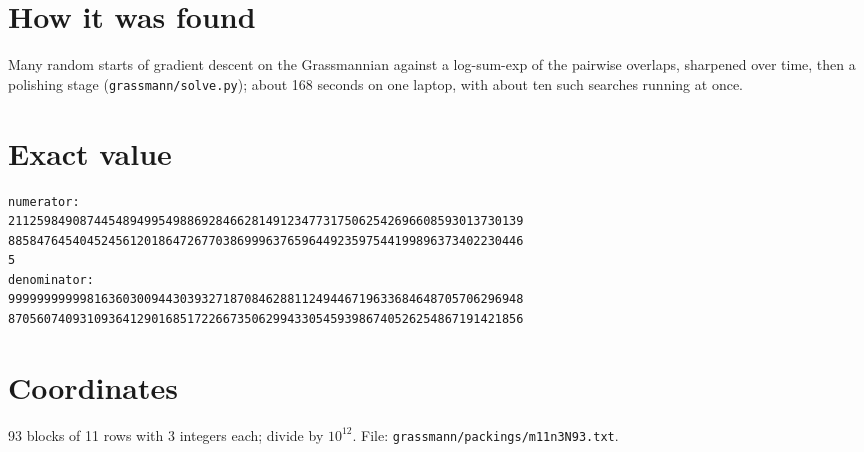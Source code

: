 \documentclass[11pt,a4paper]{article}
\begin{document}
\section{How it was found}
Many random starts of gradient descent on the Grassmannian against a log-sum-exp of the pairwise overlaps, sharpened over time, then a polishing stage (\texttt{grassmann/solve.py}); about 168 seconds on one laptop, with about ten such searches running at once.


\appendix
\section{Exact value}
{\small
\begin{verbatim}
numerator:
211259849087445489499549886928466281491234773175062542696608593013730139
885847645404524561201864726770386999637659644923597544199896373402230446
5
denominator:
999999999998163603009443039327187084628811249446719633684648705706296948
870560740931093641290168517226673506299433054593986740526254867191421856
\end{verbatim}}

\section{Coordinates}
93 blocks of 11 rows with 3 integers each; divide by $10^{12}$. File: \texttt{grassmann/packings/m11n3N93.txt}.
{\tiny
\begin{multicols}{3}
\end{multicols}}
\end{document}
